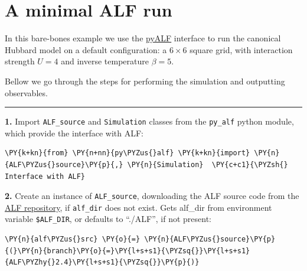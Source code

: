     
    

    
    \hypertarget{a-minimal-alf-run}{%
\section{A minimal ALF run}\label{a-minimal-alf-run}}

    In this bare-bones example we use the
\href{https://git.physik.uni-wuerzburg.de/ALF/pyALF/-/tree/ALF-2.4/}{pyALF}
interface to run the canonical Hubbard model on a default configuration:
a \(6\times6\) square grid, with interaction strength \(U=4\) and
inverse temperature \(\beta = 5\).

Bellow we go through the steps for performing the simulation and
outputting observables.

\begin{center}\rule{0.5\linewidth}{0.5pt}\end{center}

\textbf{1.} Import \texttt{ALF\_source} and \texttt{Simulation} classes
from the \texttt{py\_alf} python module, which provide the interface
with ALF:

    \begin{tcolorbox}[breakable, size=fbox, boxrule=1pt, pad at break*=1mm,colback=cellbackground, colframe=cellborder]
\begin{Verbatim}[commandchars=\\\{\}]
\PY{k+kn}{from} \PY{n+nn}{py\PYZus{}alf} \PY{k+kn}{import} \PY{n}{ALF\PYZus{}source}\PY{p}{,} \PY{n}{Simulation}  \PY{c+c1}{\PYZsh{} Interface with ALF}
\end{Verbatim}
\end{tcolorbox}

    \textbf{2.} Create an instance of \texttt{ALF\_source}, downloading the
ALF source code from the
\href{https://git.physik.uni-wuerzburg.de/ALF/ALF/-/tree/master/}{ALF
repository}, if \texttt{alf\_dir} does not exist. Gets alf\_dir from
environment variable \texttt{\$ALF\_DIR}, or defaults to ``./ALF'', if
not present:

    \begin{tcolorbox}[breakable, size=fbox, boxrule=1pt, pad at break*=1mm,colback=cellbackground, colframe=cellborder]
\begin{Verbatim}[commandchars=\\\{\}]
\PY{n}{alf\PYZus{}src} \PY{o}{=} \PY{n}{ALF\PYZus{}source}\PY{p}{(}\PY{n}{branch}\PY{o}{=}\PY{l+s+s1}{\PYZsq{}}\PY{l+s+s1}{ALF\PYZhy{}2.4}\PY{l+s+s1}{\PYZsq{}}\PY{p}{)}
\end{Verbatim}
\end{tcolorbox}

